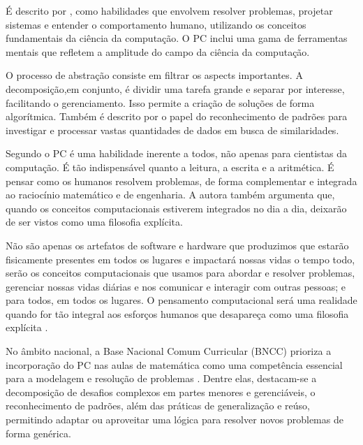 \documentclass{abnt}
\begin{document}
É descrito por \cite{wing2006}, como habilidades que envolvem resolver
problemas, projetar sistemas e entender o comportamento humano, utilizando os
conceitos fundamentais da ciência da computação. O PC inclui uma gama de
ferramentas mentais que refletem a amplitude do campo da ciência da computação.

O processo de abstração consiste em filtrar os aspects importantes. A
decomposição,em conjunto, é dividir uma tarefa grande e separar por interesse,
facilitando o gerenciamento. Isso permite a criação de soluções de forma
algorítmica. Também é descrito por \cite{wing2006} o papel do reconhecimento de
padrões para investigar e processar vastas quantidades de dados em busca de
similaridades.

Segundo \cite{wing2006} o PC é uma habilidade inerente a todos, não apenas para
cientistas da computação. É tão indispensável quanto a leitura, a escrita e a
aritmética. É pensar como os humanos resolvem problemas, de forma complementar e
integrada ao raciocínio matemático e de engenharia. A autora também argumenta
que, quando os conceitos computacionais estiverem integrados no dia a dia,
deixarão de ser vistos como uma filosofia explícita.

\begin{citacao}
Não são apenas os artefatos de software e hardware que produzimos que estarão
fisicamente presentes em todos os lugares e impactará nossas vidas o tempo todo,
serão os conceitos computacionais que usamos para abordar e resolver problemas,
gerenciar nossas vidas diárias e nos comunicar e interagir com outras pessoas; e
para todos, em todos os lugares. O pensamento computacional será uma realidade
quando for tão integral aos esforços humanos que desapareça como uma filosofia
explícita \cite[tradução nossa]{wing2006}.
\end{citacao}

No âmbito nacional, a Base Nacional Comum Curricular (BNCC) prioriza a
incorporação do PC nas aulas de matemática como uma competência essencial para a
modelagem e resolução de problemas \cite{brasil2017}. Dentre elas, destacam-se a
decomposição de desafios complexos em partes menores e gerenciáveis, o
reconhecimento de padrões, além das práticas de generalização e reúso,
permitindo adaptar ou aproveitar uma lógica para resolver novos problemas de
forma genérica.
\end{document}
